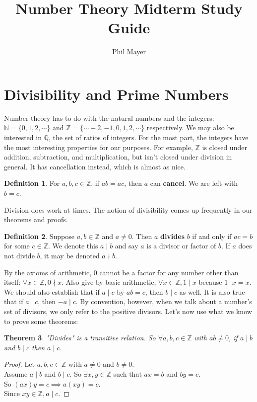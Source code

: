 \documentclass[11pt]{amsart}
\title{Number Theory Midterm Study Guide}
\author{Phil Mayer}
\newtheorem{theorem}{Theorem}[section]
\theoremstyle{definition}
\newtheorem{definition}[theorem]{Definition}
\newcommand{\rationals}{\mathbb{Q}}
\newcommand{\integers}{\mathbb{Z}}
\newcommand{\naturals}{\mathbb{N}}
\begin{document}
\maketitle

\section{Divisibility and Prime Numbers}

Number theory has to do with the natural numbers and the integers: $\naturals = \{ 0, 1, 2, \cdots \}$ and 
$\integers = \{ \cdots -2, -1 , 0, 1, 2, \cdots \}$ respectively. We may also be interested in $\rationals$, the set of ratios of integers. For the most
part, the integers have the most interesting properties for our purposes. For example, $\integers$ is closed under addition, subtraction, and
multiplication, but isn't closed under division in general. It has cancellation instead, which is almost as nice.
\begin{definition}
	For $a, b, c \in \integers$, if $ab = ac$, then $a$ can \textbf{cancel}. We are left with $b = c$.
\end{definition}
Division does work at times. The notion of divisibility comes up frequently in our theorems and proofs.
\begin{definition}
	Suppose $a, b \in \integers$ and $a \neq 0$. Then $a$ \textbf{divides} $b$ if and only if $ac = b$ for some $c \in \integers$. We denote this
	$a \mid b$ and say $a$ is a divisor or factor of $b$. If $a$ does not divide $b$, it may be denoted $a \nmid b$.
\end{definition}
By the axioms of arithmetic, 0 cannot be a factor for any number other than itself: $\forall x \in \integers, 0 \nmid x$. Also give by basic arithmetic,
$\forall x \in \integers, 1 \mid x$ because $1 \cdot x = x$. We should also establish that if $a \mid c$ by $ab = c$, then $b \mid c$ as well. 
It is also true that if $a \mid c$, then $-a \mid c$. By convention, however, when we talk about a number's set of divisors, we only refer to the
positive divisors. Let's now use what we know to prove some theorems:
\begin{theorem}
	"Divides" is a transitive relation. So $\forall a, b, c \in \integers$ with $a b \neq 0$, if $a \mid b$ and $b \mid c$ then $a \mid c$.
\end{theorem}
\begin{proof}
	Let $a, b, c \in \integers$ with $a \neq 0$ and $b \neq 0$. \\
	Assume $a \mid b$ and $b \mid c$. So $\exists x, y \in \integers$ such that $ax = b$ and $by = c$. \\
	So $(ax)y = c \implies a(xy) = c$. \\
	Since $xy \in \integers, a \mid c$.
\end{proof}
\end{document}
